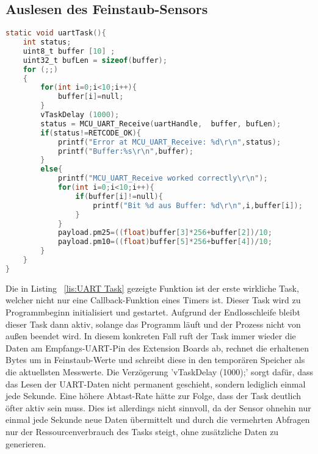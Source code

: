 \subsection{Auslesen des Feinstaub-Sensors}\label{subsec:Auslesen des Feinstaub-Sensors}
\begin{lstlisting}[language=C, caption={\acs{UART} Task}, label=lis:UART Task]
static void uartTask(){
	int status;
	uint8_t buffer [10] ;
	uint32_t bufLen = sizeof(buffer);
	for (;;)
	{
		for(int i=0;i<10;i++){
			buffer[i]=null;
		}
		vTaskDelay (1000);
		status = MCU_UART_Receive(uartHandle,  buffer, bufLen);
		if(status!=RETCODE_OK){
			printf("Error at MCU_UART_Receive: %d\r\n",status);
			printf("Buffer:%s\r\n",buffer);
		}
		else{
			printf("MCU_UART_Receive worked correctly\r\n");
			for(int i=0;i<10;i++){
				if(buffer[i]!=null){
					printf("Bit %d aus Buffer: %d\r\n",i,buffer[i]);
				}
			}
			payload.pm25=((float)buffer[3]*256+buffer[2])/10;
			payload.pm10=((float)buffer[5]*256+buffer[4])/10;
		}
	}
}
\end{lstlisting}
Die in Listing ~\ref{lis:UART Task} gezeigte Funktion ist der erste wirkliche Task, welcher nicht nur eine Callback-Funktion eines Timers ist. Dieser Task wird zu Programmbeginn initialisiert und gestartet. Aufgrund der Endlosschleife bleibt dieser Task dann aktiv, solange das Programm läuft und der Prozess nicht von außen beendet wird. In diesem konkreten Fall ruft der Task immer wieder die Daten am Empfangs-\acs{UART}-Pin des Extension Boards ab, rechnet die erhaltenen Bytes um in Feinstaub-Werte und schreibt diese in den temporären Speicher als die aktuellsten Messwerte. \newline
Die Verzögerung 'vTaskDelay (1000);' sorgt dafür, dass das Lesen der UART-Daten nicht permanent geschieht, sondern lediglich einmal jede Sekunde. Eine höhere Abtast-Rate hätte zur Folge, dass der Task deutlich öfter aktiv sein muss. Dies ist allerdings nicht sinnvoll, da der Sensor ohnehin nur einmal jede Sekunde neue Daten übermittelt und durch die vermehrten Abfragen nur der Ressourcenverbrauch des Tasks steigt, ohne zusätzliche Daten zu generieren.
